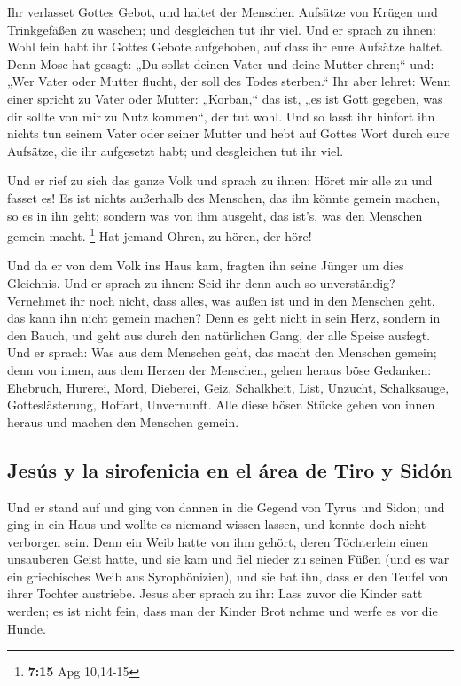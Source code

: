  Ihr verlasset Gottes Gebot, und haltet der Menschen
Aufsätze von Krügen und Trinkgefäßen zu waschen; und desgleichen tut ihr
viel.  Und er sprach zu ihnen: Wohl fein habt ihr Gottes
Gebote aufgehoben, auf dass ihr eure Aufsätze haltet. 
Denn Mose hat gesagt: „Du sollst deinen Vater und deine Mutter ehren;``
und: „Wer Vater oder Mutter flucht, der soll des Todes sterben.``
 Ihr aber lehret: Wenn einer spricht zu Vater oder
Mutter: „Korban,`` das ist, „es ist Gott gegeben, was dir sollte von mir
zu Nutz kommen``, der tut wohl.  Und so lasst ihr hinfort
ihn nichts tun seinem Vater oder seiner Mutter  und hebt
auf Gottes Wort durch eure Aufsätze, die ihr aufgesetzt habt; und
desgleichen tut ihr viel.

 Und er rief zu sich das ganze Volk und sprach zu ihnen:
Höret mir alle zu und fasset es!  Es ist nichts außerhalb
des Menschen, das ihn könnte gemein machen, so es in ihn geht; sondern
was von ihm ausgeht, das ist's, was den Menschen gemein macht.
\footnote{\textbf{7:15} Apg 10,14-15}  Hat jemand Ohren,
zu hören, der höre!

 Und da er von dem Volk ins Haus kam, fragten ihn seine
Jünger um dies Gleichnis.  Und er sprach zu ihnen: Seid
ihr denn auch so unverständig? Vernehmet ihr noch nicht, dass alles, was
außen ist und in den Menschen geht, das kann ihn nicht gemein machen?
 Denn es geht nicht in sein Herz, sondern in den Bauch,
und geht aus durch den natürlichen Gang, der alle Speise ausfegt.
 Und er sprach: Was aus dem Menschen geht, das macht den
Menschen gemein;  denn von innen, aus dem Herzen der
Menschen, gehen heraus böse Gedanken: Ehebruch, Hurerei, Mord,
 Dieberei, Geiz, Schalkheit, List, Unzucht, Schalksauge,
Gotteslästerung, Hoffart, Unvernunft.  Alle diese bösen
Stücke gehen von innen heraus und machen den Menschen gemein.

\hypertarget{jesuxfas-y-la-sirofenicia-en-el-uxe1rea-de-tiro-y-siduxf3n}{%
\subsection{Jesús y la sirofenicia en el área de Tiro y
Sidón}\label{jesuxfas-y-la-sirofenicia-en-el-uxe1rea-de-tiro-y-siduxf3n}}

 Und er stand auf und ging von dannen in die Gegend von
Tyrus und Sidon; und ging in ein Haus und wollte es niemand wissen
lassen, und konnte doch nicht verborgen sein.  Denn ein
Weib hatte von ihm gehört, deren Töchterlein einen unsauberen Geist
hatte, und sie kam und fiel nieder zu seinen Füßen  (und
es war ein griechisches Weib aus Syrophönizien), und sie bat ihn, dass
er den Teufel von ihrer Tochter austriebe.  Jesus aber
sprach zu ihr: Lass zuvor die Kinder satt werden; es ist nicht fein,
dass man der Kinder Brot nehme und werfe es vor die Hunde.

